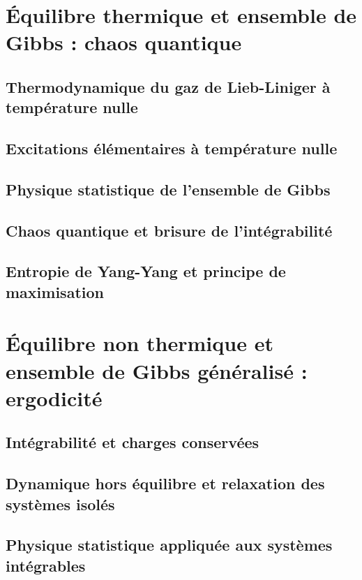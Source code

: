 \chapter{Équilibre thermique et ensemble de Gibbs : chaos quantique}
\minitoc
\section{Thermodynamique du gaz de Lieb-Liniger à température nulle}


\section{Excitations élémentaires à température nulle}
%
\section{Physique statistique de l’ensemble de Gibbs}
%


\section{Chaos quantique et brisure de l’intégrabilité}
\section{Entropie de Yang-Yang et principe de maximisation}

\chapter{Équilibre non thermique et ensemble de Gibbs généralisé : ergodicité}
\minitoc
\section{Intégrabilité et charges conservées}
\section{Dynamique hors équilibre et relaxation des systèmes isolés}
\section{Physique statistique appliquée aux systèmes intégrables}

